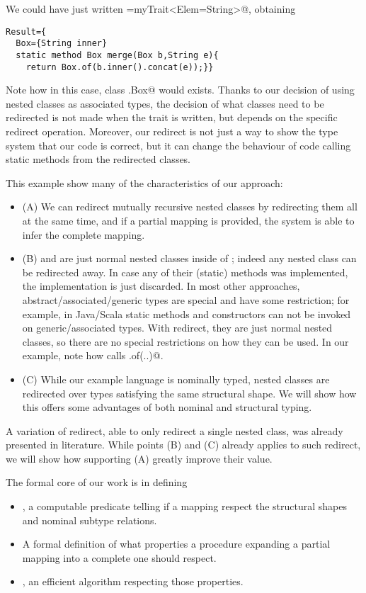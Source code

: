 We could have just written 
\Q@Result=myTrait<Elem=String>@, obtaining 
\begin{lstlisting}
Result={
  Box={String inner}
  static method Box merge(Box b,String e){
    return Box.of(b.inner().concat(e));}}
\end{lstlisting}
Note how in this case, class \Q@Result.Box@ would exists. Thanks to our decision of using nested classes
as associated types, the decision of what classes need to be redirected is not made when the trait is written,
but depends on the specific redirect operation.
Moreover, our redirect is not just a way to show the type system that our code is correct, but it can change 
the behaviour of code calling static methods from the redirected classes.


This example show many of the characteristics of our approach:
\begin{itemize}
\item(A) We can redirect mutually recursive nested classes by redirecting them all at the same time, and
if a partial mapping is provided, the system is able to infer the complete mapping.

\item(B) \Q@Box@ and \Q@Elem@ are just normal nested classes inside of \Q@myTrait@; indeed
any nested class can be redirected away.
In case any of their (static) methods was implemented, the implementation is just discarded.
In most other approaches, abstract/associated/generic types are special and have some restriction;
for example, in Java/Scala static methods and constructors can not be invoked on generic/associated types.
With redirect, they are just normal nested classes, so there are no special restrictions on how they can be used.
In our example, note how \Q@merge@ calls \Q@Box.of(..)@.

\item(C) 
While our example language is nominally typed, 
nested classes are redirected over types satisfying the same structural shape.
We will show how this offers some advantages of both nominal and structural typing.
\end{itemize}

A variation of redirect, able to only redirect a single nested class, was already presented in literature.
While points (B) and (C) already applies to such redirect,
we will show how supporting (A) greatly improve their value.

The formal core of our work is in defining 
\begin{itemize}
\item \Q@ValidRedirect@, a computable predicate telling if a mapping respect the structural shapes and
nominal subtype relations.
\item A formal definition of what properties a procedure 
expanding a partial mapping into a complete one should respect.
\item \Q@ChoseRedirect@, an efficient algorithm respecting those properties.
\end{itemize}

